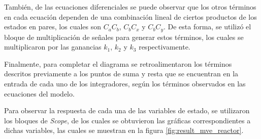 \documentclass[12pt,letterpaper]{article}
\begin{document}
También, de las ecuaciones diferenciales se puede observar que los otros términos en cada ecuación
dependen de una combinación lineal de ciertos productos de los estados en pares, los cuales son
$C_{a}C_{b}$, $C_{b}C_{x}$ y $C_{b}C_{y}$. De esta forma, se utilizó el bloque de multiplicación de
señales para generar estos términos, los cuales se multiplicaron por las ganancias $k_1$, $k_2$ y
$k_3$ respectivamente. 

Finalmente, para completar el diagrama se retroalimentaron los términos descritos previamente a 
los puntos de suma y resta que se encuentran en la entrada de cada uno de los integradores, 
según los términos observados en las ecuaciones del modelo.



Para observar la respuesta de cada una de las variables de estado, se utilizaron los bloques de
\textit{Scope}, de los cuales se obtuvieron las gráficas correspondientes a dichas variables, las
cuales se muestran en la figura \ref{fig:result_mve_reactor}.
\end{document}
